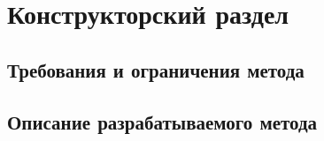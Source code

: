 \section{Конструкторский раздел}



\subsection{Требования и ограничения метода}


\subsection{Описание разрабатываемого метода}




